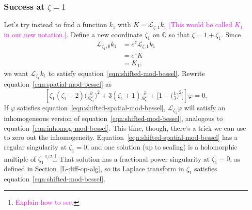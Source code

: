 \documentclass{article}
\theoremstyle{plain}
\newcommand{\C}{\mathbb{C}}
\newcommand{\laplace}{\mathcal{L}}
\begin{document}
\subsubsection{Success at $\zeta = 1$}\label{spatial-success}
Let's try instead to find a function $k_1$ with $K = \laplace_{\zeta, 1} k_1$ \textcolor{magenta}{[This would be called $K_1$ in our new notation.]}. Define a new coordinate $\zeta_1$ on $\C$ so that $\zeta = 1 + \zeta_1$. Since
\begin{align*}
\laplace_{\zeta_1, 0} k_1 & = e^z \laplace_{\zeta, 1} k_1 \\
& = e^z K \\
& = K_1,
\end{align*}
we want $\laplace_{\zeta_1} k_1$ to satisfy equation~\ref{eqn:shifted-mod-bessel}. Rewrite equation~\ref{eqn:spatial-mod-bessel} as
\begin{equation}\label{eqn:shifted-spatial-mod-bessel}
\left[\zeta_1(\zeta_1 + 2) \big(\tfrac{\partial}{\partial \zeta_1}\big)^2 + 3(\zeta_1 + 1) \tfrac{\partial}{\partial \zeta_1} + \big[1 - \big(\tfrac{1}{3}\big)^2\big]\right] \varphi = 0.
\end{equation}
If $\varphi$ satisfies equation~\ref{eqn:shifted-spatial-mod-bessel}, $\laplace_{\zeta_1} \varphi$ will satisfy an inhomogeneous version of equation~\ref{eqn:shifted-mod-bessel}, analogous to equation~\ref{eqn:inhomog-mod-bessel}. This time, though, there's a trick we can use to zero out the inhomogeneity. Equation~\ref{eqn:shifted-spatial-mod-bessel} has a regular singularity at $\zeta_1 = 0$, and one solution (up to scaling) is a holomorphic multiple of $\zeta_1^{-1/2}$.\footnote{\textcolor{magenta}{Explain how to see.}} That solution has a fractional power singularity at $\zeta_1 = 0$, as defined in Section~\ref{L-diff-op-alg}, so its Laplace transform in $\zeta_1$ satisfies equation~\ref{eqn:shifted-mod-bessel}.
\end{document}
